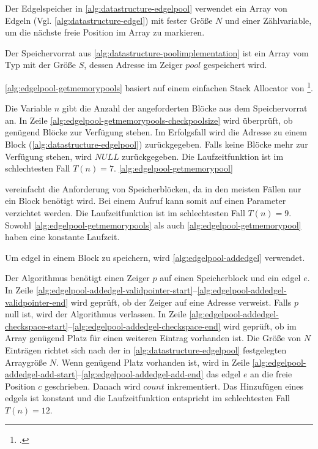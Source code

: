 Der Edgelspeicher in \autoref{alg:datastructure-edgelpool} verwendet ein Array von Edgeln
 (Vgl. \autoref{alg:datastructure-edgel}) mit fester Größe $N$ und einer Zählvariable, um die nächste freie Position im
 Array zu markieren.

Der Speichervorrat aus \autoref{alg:datastructure-poolimplementation} ist ein Array vom Typ
  mit der Größe $S$, dessen Adresse im Zeiger $\mathit{pool}$ gespeichert wird.

\autoref{alg:edgelpool-getmemorypools} basiert auf einem einfachen Stack Allocator von
 \citeauthor{kr}\footcite[Vgl.][S.~100--104]{kr}.

Die Variable $n$ gibt die Anzahl der angeforderten Blöcke aus dem Speichervorrat an. In Zeile
 \ref{alg:edgelpool-getmemorypools-checkpoolsize} wird überprüft, ob genügend Blöcke zur Verfügung stehen. Im
 Erfolgsfall wird die Adresse zu einem Block (\autoref{alg:datastructure-edgelpool}) zurückgegeben. Falls keine Blöcke
 mehr zur Verfügung stehen, wird $\mathit{NULL}$ zurückgegeben. Die Laufzeitfunktion ist im schlechtesten Fall
 $T(n)=7$.
\autoref{alg:edgelpool-getmemorypool}

 vereinfacht die Anforderung von Speicherblöcken, da in den meisten Fällen nur ein Block benötigt wird. Bei einem
 Aufruf kann somit auf einen Parameter verzichtet werden. Die Laufzeitfunktion ist im schlechtesten Fall $T(n)=9$.
 Sowohl \autoref{alg:edgelpool-getmemorypools} als auch \autoref{alg:edgelpool-getmemorypool} haben eine konstante
 Laufzeit.

Um \gls{edgel} in einem Block zu speichern, wird \autoref{alg:edgelpool-addedgel} verwendet.

Der Algorithmus benötigt einen Zeiger $p$ auf einen Speicherblock und ein \gls{edgel} $e$. In Zeile
 \ref{alg:edgelpool-addedgel-validpointer-start}--\ref{alg:edgelpool-addedgel-validpointer-end} wird geprüft, ob der
 Zeiger auf eine Adresse verweist. Falls $p$ null ist, wird der Algorithmus verlassen. In Zeile
 \ref{alg:edgelpool-addedgel-checkspace-start}--\ref{alg:edgelpool-addedgel-checkspace-end} wird geprüft, ob im Array
 genügend Platz für einen weiteren Eintrag vorhanden ist. Die Größe von $N$ Einträgen richtet sich nach der in
 \autoref{alg:datastructure-edgelpool} festgelegten Arraygröße $N$. Wenn genügend Platz vorhanden ist, wird in Zeile
 \ref{alg:edgelpool-addedgel-add-start}--\ref{alg:edgelpool-addedgel-add-end} das \gls{edgel} $e$ an die freie
 Position $c$ geschrieben. Danach wird $\mathit{count}$ inkrementiert. Das Hinzufügen eines \glspl{edgel} ist konstant
 und die Laufzeitfunktion entspricht im schlechtesten Fall $T(n) = 12$.

